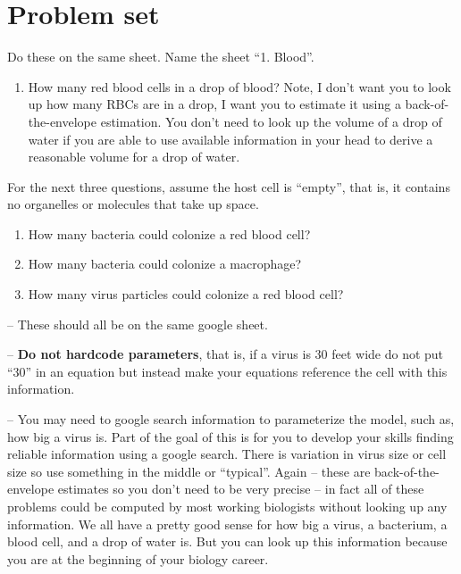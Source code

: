 \documentclass[]{book}
\providecommand{\tightlist}{%
  \setlength{\itemsep}{0pt}\setlength{\parskip}{0pt}}
\begin{document}
\section{Problem set}\label{problem-set-1}

Do these on the same sheet. Name the sheet ``1. Blood''.

\begin{enumerate}
\def\labelenumi{\arabic{enumi}.}
\tightlist
\item
  How many red blood cells in a drop of blood? Note, I don't want you to
  look up how many RBCs are in a drop, I want you to estimate it using a
  back-of-the-envelope estimation. You don't need to look up the volume
  of a drop of water if you are able to use available information in
  your head to derive a reasonable volume for a drop of water.
\end{enumerate}

For the next three questions, assume the host cell is ``empty'', that
is, it contains no organelles or molecules that take up space.

\begin{enumerate}
\def\labelenumi{\arabic{enumi}.}
\setcounter{enumi}{1}
\item
  How many bacteria could colonize a red blood cell?
\item
  How many bacteria could colonize a macrophage?
\item
  How many virus particles could colonize a red blood cell?
\end{enumerate}

-- These should all be on the same google sheet.

-- \textbf{Do not hardcode parameters}, that is, if a virus is 30 feet
wide do not put ``30'' in an equation but instead make your equations
reference the cell with this information.

-- You may need to google search information to parameterize the model,
such as, how big a virus is. Part of the goal of this is for you to
develop your skills finding reliable information using a google search.
There is variation in virus size or cell size so use something in the
middle or ``typical''. Again -- these are back-of-the-envelope estimates
so you don't need to be very precise -- in fact all of these problems
could be computed by most working biologists without looking up any
information. We all have a pretty good sense for how big a virus, a
bacterium, a blood cell, and a drop of water is. But you can look up
this information because you are at the beginning of your biology
career.
\end{document}
